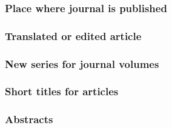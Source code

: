 \documentclass[11pt,letterpaper,oneside]{article}
\begin{document}
\begin{citebib}
\item \cite[312]{brown1978}
\end{citebib}

\setcounter{subsubsection}{181}
\subsubsection{Place where journal is published}

\begin{citebib}
\item \cite[65--70]{luu1999}
\item \cite{garrett1975}
\end{citebib}

\subsubsection{Translated or edited article}

\begin{citebib}
\item \cite{authorb}
\item \cite{authorc}
\end{citebib}

\subsubsection{New series for journal volumes}
\label{14.184}

\begin{citebib}
\item \cite[414]{sewall1896}
\item \cite{moraes1950}
\end{citebib}

\subsubsection{Short titles for articles}

\begin{citebib}
\item \cite[223]{rosenblum2015}
\end{citebib}

\subsubsection{Abstracts}
\end{document}
